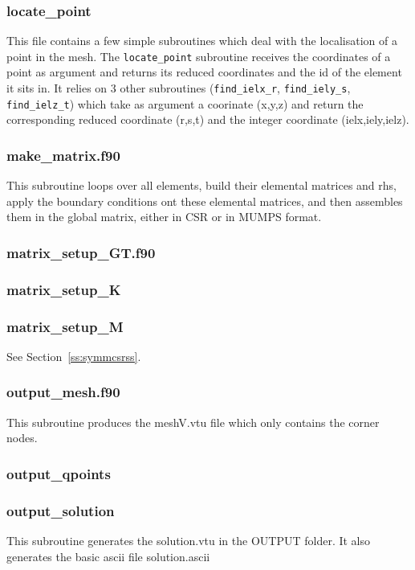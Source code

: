  \subsubsection{locate\_point}
 This file contains a few simple subroutines which deal with the localisation of a point 
 in the mesh. The {\tt locate\_point} subroutine receives the coordinates of a point as argument 
 and returns its reduced coordinates and the id of the element it sits in.
 It relies on 3 other subroutines ({\tt find\_ielx\_r}, {\tt find\_iely\_s}, {\tt find\_ielz\_t})
 which take as argument a coorinate (x,y,z) and return the corresponding reduced
 coordinate (r,s,t) and the integer coordinate (ielx,iely,ielz).
 \subsubsection{make\_matrix.f90}
 This subroutine loops over all elements, build their elemental matrices and rhs, 
 apply the boundary conditions ont these elemental matrices, and then 
 assembles them in the global matrix, either in CSR or in MUMPS format.
 \subsubsection{matrix\_setup\_GT.f90}

 \subsubsection{matrix\_setup\_K}

 \subsubsection{matrix\_setup\_M}
 See Section~\ref{ss:symmcsrss}. 
 \subsubsection{output\_mesh.f90}
 This subroutine produces the {\filenamefont meshV.vtu} file which only 
 contains the corner nodes.
 \subsubsection{output\_qpoints}

 \subsubsection{output\_solution}
 This subroutine generates the {\filenamefont solution.vtu} in the {\foldernamefont OUTPUT}
 folder. It also generates the basic ascii file {\filenamefont solution.ascii}
